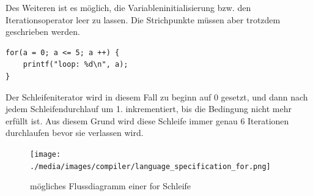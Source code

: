 Des Weiteren ist es m\"oglich, die Variableninitialisierung bzw. den Iterationsoperator leer zu lassen. Die Strichpunkte m\"ussen aber trotzdem geschrieben werden.


\begin{lstlisting}[language=CMM]
for(a = 0; a <= 5; a ++) {
	printf("loop: %d\n", a);
}
\end{lstlisting}

Der Schleifeniterator wird in diesem Fall zu beginn auf 0 gesetzt, und dann nach jedem Schleifendurchlauf um 1. inkrementiert, bis die Bedingung nicht mehr erf\"ullt ist. Aus diesem Grund wird diese Schleife immer genau 6 Iterationen durchlaufen bevor sie verlassen wird. 

\begin{figure}[h]
\centering
\texttt{[image: ./media/images/compiler/language\_specification\_for.png]}
\caption{m\"ogliches Flussdiagramm einer for Schleife}
\label{language_specification_for}
\end{figure}